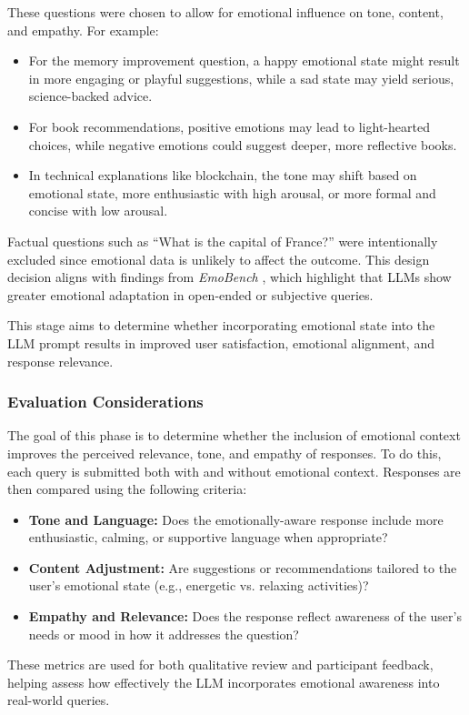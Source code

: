 \par These questions were chosen to allow for emotional influence on tone, content, and empathy. For example:
\begin{itemize}
    \item For the memory improvement question, a happy emotional state might result in more engaging or playful suggestions, while a sad state may yield serious, science-backed advice.
    \item For book recommendations, positive emotions may lead to light-hearted choices, while negative emotions could suggest deeper, more reflective books.
    \item In technical explanations like blockchain, the tone may shift based on emotional state, more enthusiastic with high arousal, or more formal and concise with low arousal.
\end{itemize}

\par Factual questions such as “What is the capital of France?” were intentionally excluded since emotional data is unlikely to affect the outcome. This design decision aligns with findings from \textit{EmoBench} \cite{sabour2024emobench}, which highlight that LLMs show greater emotional adaptation in open-ended or subjective queries.


\par This stage aims to determine whether incorporating emotional state into the LLM prompt results in improved user satisfaction, emotional alignment, and response relevance. 


\subsubsection*{Evaluation Considerations}

\par The goal of this phase is to determine whether the inclusion of emotional context improves the perceived relevance, tone, and empathy of responses. To do this, each query is submitted both with and without emotional context. Responses are then compared using the following criteria:

\begin{itemize}
    \item \textbf{Tone and Language:} Does the emotionally-aware response include more enthusiastic, calming, or supportive language when appropriate?
    \item \textbf{Content Adjustment:} Are suggestions or recommendations tailored to the user’s emotional state (e.g., energetic vs. relaxing activities)?
    \item \textbf{Empathy and Relevance:} Does the response reflect awareness of the user’s needs or mood in how it addresses the question?
\end{itemize}

\par These metrics are used for both qualitative review and participant feedback, helping assess how effectively the LLM incorporates emotional awareness into real-world queries.